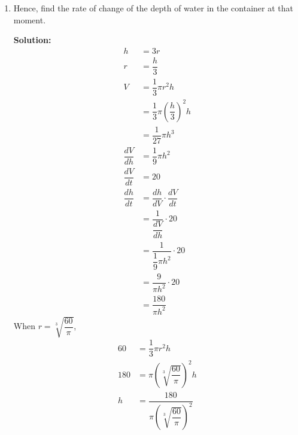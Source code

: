 \documentclass{report}
\newcommand{\sol}{\textbf{Solution:}}
\begin{document}
\begin{enumerate}[leftmargin=*]
\begin{enumerate}
\begin{enumerate}
                        \item Hence, find the rate of change of the depth of water in the container at that
                              moment.

                              \sol{}
                              \begin{align*}
                                  h              & = 3r                                            \\
                                  r              & = \dfrac{h}{3}                                  \\
                                  V              & = \dfrac{1}{3}\pi r^2 h                         \\
                                                 & = \dfrac{1}{3}\pi \left(\dfrac{h}{3}\right)^2 h \\
                                                 & = \dfrac{1}{27}\pi h^3                          \\
                                  \dfrac{dV}{dh} & = \dfrac{1}{9}\pi h^2                           \\
                                  \dfrac{dV}{dt} & = 20                                            \\
                                  \dfrac{dh}{dt} & = \dfrac{dh}{dV} \cdot \dfrac{dV}{dt}           \\
                                                 & = \dfrac{1}{\dfrac{dV}{dh}} \cdot 20            \\
                                                 & = \dfrac{1}{\dfrac{1}{9}\pi h^2} \cdot 20       \\
                                                 & = \dfrac{9}{\pi h^2} \cdot 20                   \\
                                                 & = \dfrac{180}{\pi h^2}
                              \end{align*}
                              When $r = \sqrt[3]{\dfrac{60}{\pi}}$,
                              \begin{align*}
                                  60  & = \dfrac{1}{3}\pi r^2 h                                     \\
                                  180 & = \pi \left(\sqrt[3]{\dfrac{60}{\pi}}\right)^2 h            \\
                                  h   & = \dfrac{180}{\pi \left(\sqrt[3]{\dfrac{60}{\pi}}\right)^2}

\end{align*}
\end{enumerate}
\end{enumerate}
\end{enumerate}
\end{document}
